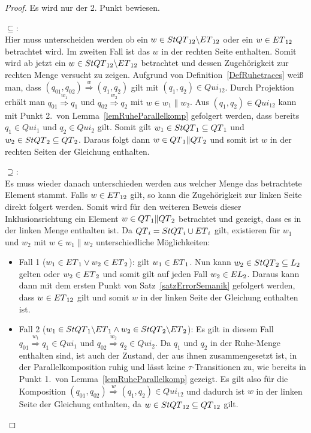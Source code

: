 \begin{proof}
  Es wird nur der 2. Punkt bewiesen.

  \glqq $\subseteq$\grqq :\\
  Hier muss unterscheiden werden ob ein $w\in StQT{}_{12}\backslash ET{}_{12}$
  oder ein $w\in ET{}_{12}$ betrachtet wird. Im zweiten Fall ist das
  $w$ in der rechten Seite enthalten. Somit wird ab jetzt ein $w\in
  StQT{}_{12}\backslash ET{}_{12}$ betrachtet und dessen Zugehörigkeit zur
  rechten Menge versucht zu zeigen. Aufgrund von
  Definition~\ref{DefRuhetraces} weiß man, dass $(q_{01},q_{02})
  \overset{w}{\Rightarrow} (q_1,q_2)$ gilt mit $(q_1,q_2)\in Qui_{12}$. Durch
  Projektion erhält man $q_{01} \overset{w_1}{\Rightarrow} q_1$ und $q_{02}
  \overset{w_2}{\Rightarrow} q_2$ mit $w\in w_1\|w_2$. Aus $(q_1,q_2)\in
  Qui_{12}$ kann mit Punkt 2.\ von Lemma~\ref{lemRuheParallelkomp} gefolgert
  werden, dass bereits $q_1\in Qui_1$ und $q_2\in Qui_2$ gilt. Somit gilt
  $w_1\in StQT{}_1\subseteq QT{}_1$ und $w_2\in StQT{}_2\subseteq QT{}_2$.
  Daraus folgt dann $w\in QT{}_1\|QT{}_2$ und somit ist $w$ in der rechten
  Seiten der Gleichung enthalten.

  \glqq $\supseteq$\grqq :\\
  Es muss wieder danach unterschieden werden aus welcher Menge das betrachtete
  Element stammt. Falls $w\in ET{}_{12}$ gilt, so kann die
  Zugehörigkeit zur linken Seite direkt folgert werden. Somit wird für den
  weiteren Beweis dieser Inklusionsrichtung ein Element $w\in QT{}_1\|QT{}_2$
  betrachtet und gezeigt, dass es in der linken Menge enthalten ist. Da
  $QT{}_i = StQT{}_i\cup ET{}_i$ gilt, existieren für $w_1$ und $w_2$ mit
  $w\in w_1\| w_2$ unterschiedliche Möglichkeiten:
  \begin{itemize}
    \item Fall 1 ($w_1\in ET{}_1\vee w_2\in ET{}_2$): \OBdA{} gilt
      $w_1\in ET{}_1$. Nun kann $w_2\in StQT{}_2\subseteq L_2$ gelten
      oder $w_2\in ET{}_2$ und somit gilt auf jeden Fall $w_2\in
      EL{}_2$. Daraus kann dann mit dem ersten Punkt von
      Satz~\ref{satzErrorSemanik} gefolgert werden, dass $w\in ET{}_{12}$ gilt
      und somit $w$ in der linken Seite der Gleichung enthalten ist.
    \item Fall 2 ($w_1\in StQT{}_1\backslash ET{}_1\wedge w_2\in
      StQT{}_2\backslash ET{}_2$): Es gilt in diesem Fall $q_{01}
      \overset{w_1}{\Rightarrow} q_1\in Qui_1$ und $q_{02}
      \overset{w_2}{\Rightarrow} q_2\in Qui_2$. Da $q_1$ und $q_2$ in der
      Ruhe-Menge enthalten sind, ist auch der Zustand, der aus ihnen
      zusammengesetzt ist, in der Parallelkomposition ruhig und lässt keine
      $\tau$-Transitionen zu, wie bereits in Punkt 1.\ von
      Lemma~\ref{lemRuheParallelkomp} gezeigt. Es gilt also für die Komposition
      $(q_{01},q_{02}) \overset{w}{\Rightarrow} (q_1,q_2)\in Qui_{12}$ und
      dadurch ist $w$ in der linken Seite der Gleichung enthalten, da $w\in
      StQT{}_{12}\subseteq QT{}_{12}$ gilt.
  \end{itemize}
\end{proof}

